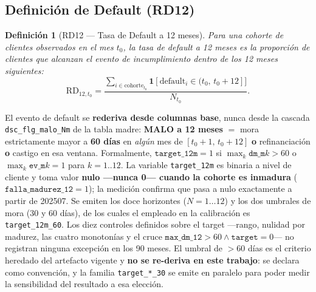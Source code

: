 \documentclass[12pt, a4paper]{article}
\newcommand{\RD}{\ensuremath{\mathrm{RD}}}
\newtheorem{definicion}{Definición}[section]
\begin{document}
\subsection{Definición de Default (RD12)}
\begin{definicion}[RD12 --- Tasa de Default a 12 meses]
Para una cohorte de clientes observados en el mes $t_0$, la tasa de default a 12 meses es la
proporción de clientes que alcanzan el evento de incumplimiento dentro de los 12 meses
siguientes:
\begin{equation}
  \RD_{12,t_0} = \frac{\sum_{i\in\text{cohorte}_{t_0}}
  \mathbf{1}[\text{default}_i\in(t_0,\,t_0+12]]}{N_{t_0}}.
\end{equation}
\end{definicion}
El evento de default se \textbf{rederiva desde columnas base}, nunca desde la cascada
\texttt{dsc\_flg\_malo\_Nm} de la tabla madre: \textbf{MALO a 12 meses} $=$ mora
estrictamente mayor a \textbf{60 días} en \emph{algún} mes de $[t_0{+}1,\,t_0{+}12]$
\textbf{o} refinanciación \textbf{o} castigo en esa ventana. Formalmente,
$\texttt{target\_12m}=1$ si $\max_k \texttt{dm\_m}k>60$ o $\max_k \texttt{ev\_m}k=1$ para
$k=1..12$. La variable \texttt{target\_12m} es binaria a nivel de cliente y toma valor \textbf{nulo
---nunca 0--- cuando la cohorte es inmadura} ($\texttt{falla\_madurez\_12}=1$); la medición
confirma que pasa a nulo exactamente a partir de 202507. Se emiten los doce horizontes
($N=1\ldots12$) y los dos umbrales de mora (30 y 60 días), de los cuales el empleado en la
calibración es \texttt{target\_12m\_60}. Los diez controles definidos sobre el target ---rango,
nulidad por madurez, las cuatro monotonías y el cruce
$\texttt{max\_dm\_12}>60 \wedge \texttt{target}=0$--- no registran ninguna excepción en los 90
meses. El umbral de $>60$ días es el criterio heredado del artefacto vigente y \textbf{no se
re-deriva en este trabajo}: se declara como convención, y la familia \texttt{target\_*\_30} se
emite en paralelo para poder medir la sensibilidad del resultado a esa elección.
\end{document}
